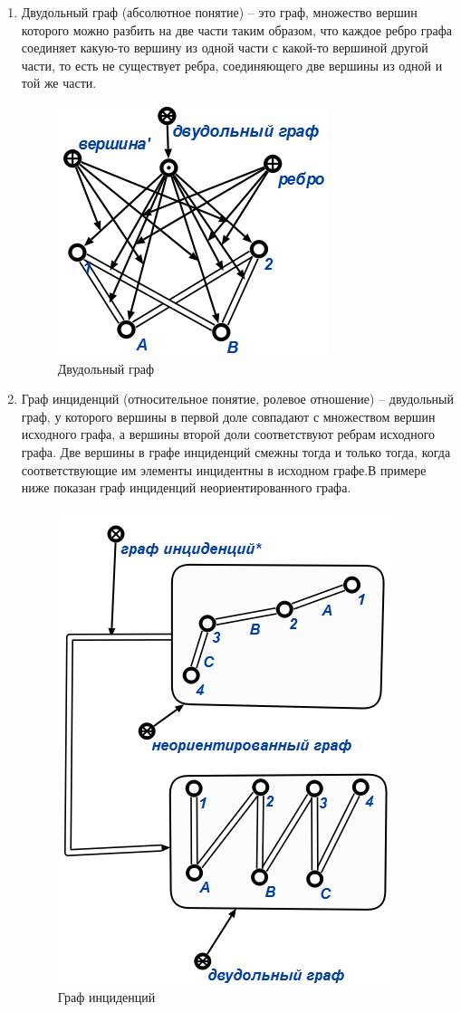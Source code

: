 \begin{enumerate}
\item
Двудольный граф (абсолютное понятие) -- это граф, множество вершин которого можно разбить на две части таким образом, что каждое ребро графа соединяет какую-то вершину из одной части с какой-то вершиной другой части, то есть не существует ребра, соединяющего две вершины из одной и той же части.

\begin{figure}[H]
  \centering
  \includegraphics[scale=0.7]{images/10.png}
  \caption{Двудольный граф}
\end{figure}

\item
Граф инциденций (относительное понятие, ролевое отношение) -- двудольный граф, у которого вершины в первой доле совпадают с множеством вершин исходного графа, а вершины второй доли соответствуют ребрам исходного графа. Две вершины в графе инциденций смежны тогда и только тогда, когда соответствующие им элементы инцидентны в исходном графе.В примере ниже показан граф инциденций неориентированного графа.

\begin{figure}[H]
  \centering
  \includegraphics[scale=0.7]{images/11.png}
  \caption{Граф инциденций}
\end{figure}


\end{enumerate}
